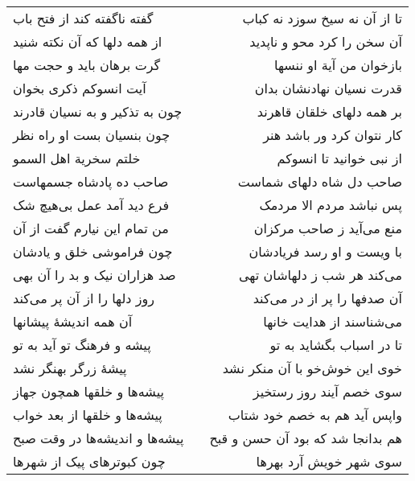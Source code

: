 \begin{center}
\begin{longtable}{l p{0.5cm} r}
گفته ناگفته کند از فتح باب
&&
تا از آن نه سیخ سوزد نه کباب
\\
از همه دلها که آن نکته شنید
&&
آن سخن را کرد محو و ناپدید
\\
گرت برهان باید و حجت مها
&&
بازخوان من آیة او ننسها
\\
آیت انسوکم ذکری بخوان
&&
قدرت نسیان نهادنشان بدان
\\
چون به تذکیر و به نسیان قادرند
&&
بر همه دلهای خلقان قاهرند
\\
چون بنسیان بست او راه نظر
&&
کار نتوان کرد ور باشد هنر
\\
خلتم سخریة اهل السمو
&&
از نبی خوانید تا انسوکم
\\
صاحب ده پادشاه جسمهاست
&&
صاحب دل شاه دلهای شماست
\\
فرع دید آمد عمل بی‌هیچ شک
&&
پس نباشد مردم الا مردمک
\\
من تمام این نیارم گفت از آن
&&
منع می‌آید ز صاحب مرکزان
\\
چون فراموشی خلق و یادشان
&&
با ویست و او رسد فریادشان
\\
صد هزاران نیک و بد را آن بهی
&&
می‌کند هر شب ز دلهاشان تهی
\\
روز دلها را از آن پر می‌کند
&&
آن صدفها را پر از در می‌کند
\\
آن همه اندیشهٔ پیشانها
&&
می‌شناسند از هدایت خانها
\\
پیشه و فرهنگ تو آید به تو
&&
تا در اسباب بگشاید به تو
\\
پیشهٔ زرگر بهنگر نشد
&&
خوی این خوش‌خو با آن منکر نشد
\\
پیشه‌ها و خلقها همچون جهاز
&&
سوی خصم آیند روز رستخیز
\\
پیشه‌ها و خلقها از بعد خواب
&&
واپس آید هم به خصم خود شتاب
\\
پیشه‌ها و اندیشه‌ها در وقت صبح
&&
هم بدانجا شد که بود آن حسن و قبح
\\
چون کبوترهای پیک از شهرها
&&
سوی شهر خویش آرد بهرها
\\
\end{longtable}
\end{center}

